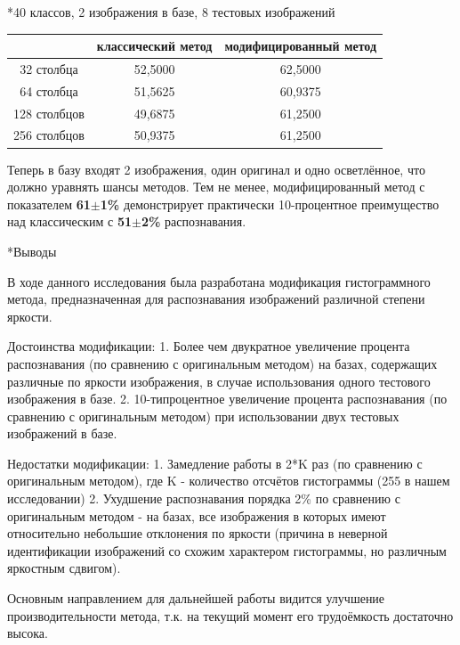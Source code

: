 \documentclass[a4paper,12pt,titlpage]{posobie}
\makeatletter
\renewcommand{\section}{\@startsection{section}{1}{0.0cm}{0.5cm}{0.1cm}%
             {\fontsize{16}{16}\bf\selectfont }}
\renewcommand{\subsubsection}{\@startsection{subsubsection}{3}{0.0cm}{0.2cm}{0.1cm}%
    {\fontsize{16}{16}\it\selectfont }}
\makeatother
\begin{document}
\subsubsection*{40 классов, 2 изображения в базе, 8 тестовых изображений}

\begin{tabular}{|c|c|c|} \hline
&классический метод&модифицированный метод\\ \hline
32 столбца&52,5000&62,5000\\ \hline
64 столбца&51,5625&60,9375\\ \hline
128 столбцов&49,6875&61,2500\\ \hline
256 столбцов&50,9375&61,2500\\ \hline
\end{tabular}

Теперь в базу входят 2 изображения, один оригинал и одно осветлённое, что должно уравнять шансы методов. 
Тем не менее, модифицированный метод с показателем \textbf{61}$\pm$\textbf{1\%} демонстрирует практически 
10-процентное преимущество над классическим с \textbf{51}$\pm$\textbf{2\%} распознавания.


\section*{Выводы}

В ходе данного исследования была разработана модификация гистограммного метода, предназначенная для распознавания изображений различной степени яркости.

Достоинства модификации:
1. Более чем двукратное увеличение процента распознавания (по сравнению с оригинальным методом) на базах, содержащих различные по яркости изображения, в случае использования одного тестового изображения в базе.
2. 10-типроцентное увеличение процента распознавания (по сравнению с оригинальным методом) при использовании двух тестовых изображений в базе.

Недостатки модификации:
1. Замедление работы в 2*K раз (по сравнению с оригинальным методом), где K - количество отсчётов гистограммы (255 в нашем исследовании)
2. Ухудшение распознавания порядка 2\% по сравнению с оригинальным методом - на базах, все изображения в которых имеют относительно небольшие отклонения по яркости (причина в неверной идентификации изображений со схожим характером гистограммы, но различным яркостным сдвигом).

Основным направлением для дальнейшей работы видится улучшение производительности метода, т.к. на текущий момент его трудоёмкость достаточно высока.
\end{document}
